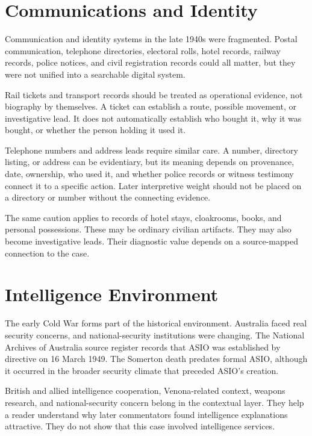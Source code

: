 \section{Communications and Identity}

Communication and identity systems in the late 1940s were fragmented. Postal communication, telephone directories, electoral rolls, hotel records, railway records, police notices, and civil registration records could all matter, but they were not unified into a searchable digital system.

Rail tickets and transport records should be treated as operational evidence, not biography by themselves. A ticket can establish a route, possible movement, or investigative lead. It does not automatically establish who bought it, why it was bought, or whether the person holding it used it.

Telephone numbers and address leads require similar care. A number, directory listing, or address can be evidentiary, but its meaning depends on provenance, date, ownership, who used it, and whether police records or witness testimony connect it to a specific action. Later interpretive weight should not be placed on a directory or number without the connecting evidence.

The same caution applies to records of hotel stays, cloakrooms, books, and personal possessions. These may be ordinary civilian artifacts. They may also become investigative leads. Their diagnostic value depends on a source-mapped connection to the case.

\section{Intelligence Environment}

The early Cold War forms part of the historical environment. Australia faced real security concerns, and national-security institutions were changing. The National Archives of Australia source register records that ASIO was established by directive on 16 March 1949. The Somerton death predates formal ASIO, although it occurred in the broader security climate that preceded ASIO's creation.

British and allied intelligence cooperation, Venona-related context, weapons research, and national-security concern belong in the contextual layer. They help a reader understand why later commentators found intelligence explanations attractive. They do not show that this case involved intelligence services.

